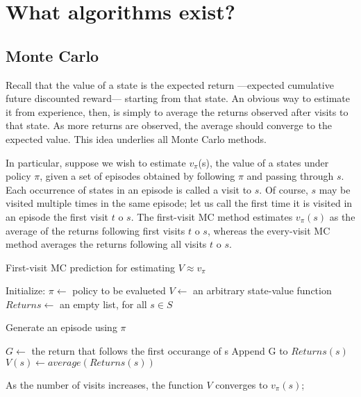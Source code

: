\documentclass[letterpaper, 10 pt]{IEEEconf}
\begin{document}
\section{What algorithms exist?}

\subsection{Monte Carlo}

Recall that the value of a state is the expected return —expected cumulative future discounted reward— starting from that state. An obvious way to estimate it from experience, then, is simply to average the returns observed after visits to that state. As more returns are observed, the average should converge to the expected value. This idea underlies all Monte Carlo methods.

In particular, suppose we wish to estimate $v_\pi$(s), the value of a
states under policy $\pi$, given a set of episodes obtained by
following $\pi$ and passing through $s$. Each occurrence of states in an
episode is called a visit to $s$. Of course, $s$ may be visited multiple
times in the same episode; let us call the first time it is visited in
an episode the first visit $t$ o $s$. The first-visit MC method estimates
$v_\pi(s)$ as the average of the returns following first visits $t$ o $s$,
whereas the every-visit MC method averages the returns following all
visits $t$ o $s$.

\begin{algorithm}
	\caption{First-visit MC prediction for estimating $V \approx v_{\pi}$}
	\begin{algorithmic}[1]

		\State Initialize:
		\State $\pi \leftarrow$ policy to be evalueted
		\State $V \leftarrow$ an arbitrary state-value function
		\State $Returns \leftarrow$ an empty list, for all $s \in \mathit{S}$

		\State Generate an episode using $\pi$


		\State $G \leftarrow$ the return that follows the first occurange of s
		\State Append G to $Returns(s)$
		\State $V(s) \leftarrow average(Returns(s))$
		\EndFor
		\EndWhile

	\end{algorithmic}
\end{algorithm}

As the number of visits increases, the function $V$ converges to $v_\pi(s)$;
\end{document}
